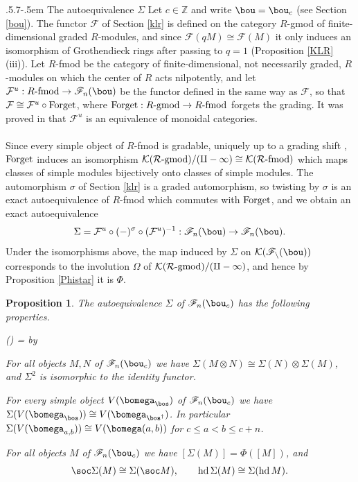 \documentclass[11pt,reqno]{amsart}
\makeatletter
\newtheorem*{prop}{Proposition}
\theoremstyle{definition} \newtheorem*{defn}{Definition}
\theoremstyle{definition}
\newcounter{cnt}
\newenvironment{enumerit}{\begin{list}{{\hfill\rm(\roman{cnt})\hfill}}{%
\settowidth{\labelwidth}{{\rm(iv)}}\leftmargin=\labelwidth%
\advance\leftmargin by \labelsep\rightmargin=0pt\usecounter{cnt}}}{\end{list}} \makeatletter
\numberwithin{equation}{section}
\def\subsection{\def\@secnumfont{\bfseries}\@startsection{subsection}{2}%
  {\parindent}{.5\linespacing\@plus.7\linespacing}{-.5em}%
  {\normalfont\bfseries}}
\makeatother
\begin{document}
\subsection{The autoequivalence $\Sigma$}\label{Sigma} Let $c\in\mathbb Z$ and write $\bou=\bou_c$ (see Section
\ref{bou}). The functor $\mathcal F$ of Section \ref{klr} is defined on the category $R$-gmod of finite-dimensional
graded $R$-modules, and since $\mathcal F(qM)\cong\mathcal F(M)$ it only induces an isomorphism of Grothendieck rings
after passing to $q=1$ (Proposition \ref{KLR}(iii)). Let $R$-fmod be the category of finite-dimensional, not
necessarily graded, $R$-modules on which the center of $R$ acts nilpotently, and let $\mathcal F^u:R\text{-fmod}\to\mathscr F_n(\bou)$
be the functor defined in the same way as $\mathcal F$, so that $\mathcal F\cong\mathcal F^u\circ{\rm Forget}$, where
${\rm Forget}:R\text{-gmod}\to R\text{-fmod}$ forgets the grading. It was proved in \cite[Theorem B]{Fuj} that $\mathcal F^u$ is an
equivalence of monoidal categories.
\\\\
Since every simple object of $R$-fmod is gradable, uniquely up to a grading shift \cite[Section 2.5]{KL09}, ${\rm Forget}$ induces
an isomorphism $\cal K(R\text{-gmod})/(q-1)\cong\cal K(R\text{-fmod})$ which maps classes of simple modules bijectively onto
classes of simple modules. The automorphism $\sigma$ of Section \ref{klr} is a graded automorphism, so twisting by
$\sigma$ is an exact autoequivalence of $R$-fmod which commutes with ${\rm Forget}$, and we obtain an exact
autoequivalence
$$\Sigma=\mathcal F^u\circ(-)^\sigma\circ(\mathcal F^u)^{-1}:\mathscr F_n(\bou)\to\mathscr F_n(\bou).$$
Under the isomorphisms above, the map induced by $\Sigma$ on $\cal K(\mathscr F_n(\bou))$ corresponds to the involution
$\Omega$ of $\cal K(R\text{-gmod})/(q-1)$, and hence by Proposition \ref{Phistar} it is $\Phi$.
\begin{prop}\label{Sigmaprop} The autoequivalence $\Sigma$ of $\mathscr F_n(\bou_c)$ has the following properties.
\begin{enumerit}
\item[(i)] For all objects $M,N$ of $\mathscr F_n(\bou_c)$ we have $\Sigma(M\otimes N)\cong\Sigma(N)\otimes\Sigma(M)$,
and $\Sigma^2$ is isomorphic to the identity functor.
\item[(ii)] For every simple object $V(\bomega_\bos)$ of $\mathscr F_n(\bou_c)$ we have
$\Sigma(V(\bomega_\bos))\cong V(\bomega_{\bos^\dagger})$. In particular
$\Sigma(V(\bomega_{a,b}))\cong V(\bomega(a,b))$ for $c\le a<b\le c+n$.
\item[(iii)] For all objects $M$ of $\mathscr F_n(\bou_c)$ we have $[\Sigma(M)]=\Phi([M])$, and
$$\soc\Sigma(M)\cong\Sigma(\soc M),\qquad {\rm hd}\,\Sigma(M)\cong\Sigma({\rm hd}\,M).$$
\end{enumerit}
\end{prop}
\end{document}
